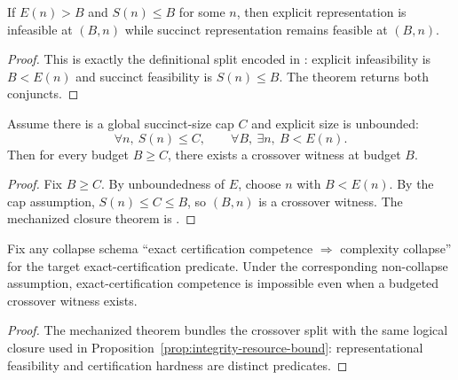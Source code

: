\begin{proposition}\label{prop:budgeted-crossover}
If $E(n) > B$ and $S(n) \le B$ for some $n$, then explicit representation is infeasible at $(B,n)$ while succinct representation remains feasible at $(B,n)$.
\end{proposition}

\begin{proof}
This is exactly the definitional split encoded in : explicit infeasibility is $B < E(n)$ and succinct feasibility is $S(n)\le B$. The theorem  returns both conjuncts.
\end{proof}

\begin{proposition}\label{prop:crossover-above-cap}
Assume there is a global succinct-size cap $C$ and explicit size is unbounded:
\[
\forall n,\ S(n)\le C,\qquad
\forall B,\ \exists n,\ B < E(n).
\]
Then for every budget $B\ge C$, there exists a crossover witness at budget $B$.
\end{proposition}

\begin{proof}
Fix $B\ge C$. By unboundedness of $E$, choose $n$ with $B < E(n)$. By the cap assumption, $S(n)\le C\le B$, so $(B,n)$ is a crossover witness. The mechanized closure theorem is .
\end{proof}

\begin{proposition}\label{prop:crossover-not-certification}
Fix any collapse schema ``exact certification competence $\Rightarrow$ complexity collapse'' for the target exact-certification predicate. Under the corresponding non-collapse assumption, exact-certification competence is impossible even when a budgeted crossover witness exists.
\end{proposition}

\begin{proof}
The mechanized theorem  bundles the crossover split with the same logical closure used in Proposition~\ref{prop:integrity-resource-bound}: representational feasibility and certification hardness are distinct predicates.
\end{proof}

